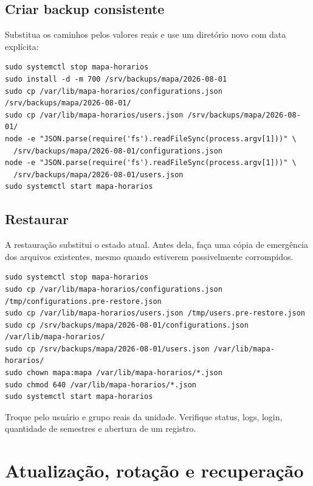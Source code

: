 \section{Criar backup consistente}

Substitua os caminhos pelos valores reais e use um diretório novo com data explícita:

\begin{lstlisting}
sudo systemctl stop mapa-horarios
sudo install -d -m 700 /srv/backups/mapa/2026-08-01
sudo cp /var/lib/mapa-horarios/configurations.json /srv/backups/mapa/2026-08-01/
sudo cp /var/lib/mapa-horarios/users.json /srv/backups/mapa/2026-08-01/
node -e "JSON.parse(require('fs').readFileSync(process.argv[1]))" \
  /srv/backups/mapa/2026-08-01/configurations.json
node -e "JSON.parse(require('fs').readFileSync(process.argv[1]))" \
  /srv/backups/mapa/2026-08-01/users.json
sudo systemctl start mapa-horarios
\end{lstlisting}

\section{Restaurar}

\begin{dangerbox}
A restauração substitui o estado atual. Antes dela, faça uma cópia de emergência dos arquivos existentes, mesmo quando estiverem possivelmente corrompidos.
\end{dangerbox}

\begin{lstlisting}
sudo systemctl stop mapa-horarios
sudo cp /var/lib/mapa-horarios/configurations.json /tmp/configurations.pre-restore.json
sudo cp /var/lib/mapa-horarios/users.json /tmp/users.pre-restore.json
sudo cp /srv/backups/mapa/2026-08-01/configurations.json /var/lib/mapa-horarios/
sudo cp /srv/backups/mapa/2026-08-01/users.json /var/lib/mapa-horarios/
sudo chown mapa:mapa /var/lib/mapa-horarios/*.json
sudo chmod 640 /var/lib/mapa-horarios/*.json
sudo systemctl start mapa-horarios
\end{lstlisting}

Troque  pelo usuário e grupo reais da unidade. Verifique status, logs, login, quantidade de semestres e abertura de um registro.

\chapter{Atualização, rotação e recuperação}

